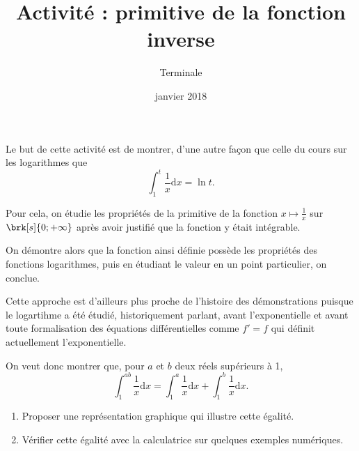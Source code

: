 \documentclass[12pt,a4paper,french]{article}
\title{Activité : primitive de la fonction inverse}
\author{Terminale}
\date{janvier 2018}
\makeatletter
\renewcommand{\maketitle}%
{\framebox{%
    \begin{minipage}{0.98\linewidth}%
      \begin{center}%
        \Large \@title ~-- \@author \\%
        \@date%
      \end{center}%
  \end{minipage}}%
  \normalsize%
}
\theoremstyle{break}
\theoremstyle{break}
\theoremstyle{nonumberplain}
\makeatother
\begin{document}
\maketitle

\bigskip

Le but de cette activité est de montrer, d'une autre façon que celle du
cours sur les logarithmes que \[ \int_1^t \frac1x \mathrm{d}x = \ln t
.\]

Pour cela, on étudie les propriétés de la primitive de la fonction $x
\mapsto \frac1x$ sur $\brk[s]{0;+\infty}$ après avoir justifié que la
fonction y était intégrable.

On démontre alors que la fonction ainsi définie possède les propriétés
des fonctions logarithmes, puis en étudiant le valeur en un point
particulier, on conclue.

Cette approche est d'ailleurs plus proche de l'histoire des
démonstrations puisque le logartihme a été étudié, historiquement
parlant, avant l'exponentielle et avant toute formalisation des
équations différentielles comme $f' = f$ qui définit actuellement
l'exponentielle.

\begin{center}
\end{center}

On veut donc montrer que, pour $a$ et $b$ deux réels supérieurs à 1, \[
\int_1^{ab} \frac1x \mathrm{d}x = \int_1^a \frac1x \mathrm{d}x +
\int_1^b \frac 1x \mathrm{d}x .\]

\begin{enumerate}
  \item Proposer une représentation graphique qui illustre cette
    égalité.
  \item Vérifier cette égalité avec la calculatrice sur quelques
    exemples numériques.
\end{enumerate}

\pagebreak
\end{document}

